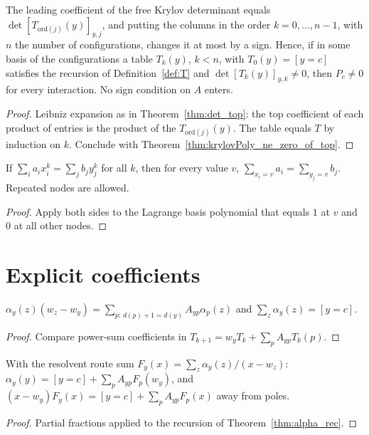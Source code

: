 \begin{theorem}
  \label{thm:krylovPoly_ne_zero_of_table}
  \leanok
  The leading coefficient of the free Krylov determinant equals $\det[T_{\mathrm{ord}(j)}(y)]_{y,j}$, and putting
  the columns in the order $k=0,\dots,n-1$, with $n$ the number of configurations, changes it at most by a sign. Hence,
  if in some basis of the configurations a table $T_k(y)$, $k<n$, with $T_0(y)=[y=c]$ satisfies the recursion of
  Definition~\ref{def:T} and $\det[T_k(y)]_{y,k}\neq0$, then $P_c\neq0$ for every interaction. No sign
  condition on $A$ enters.
\end{theorem}
\begin{proof}
  \leanok
  Leibniz expansion as in Theorem~\ref{thm:det_top}: the top coefficient of each product of entries is the
  product of the $T_{\mathrm{ord}(j)}(y)$. The table equals $T$ by induction on $k$. Conclude with
  Theorem~\ref{thm:krylovPoly_ne_zero_of_top}.
\end{proof}

\begin{theorem}
  \label{thm:ps_unique}
  \leanok
  If $\sum_ia_ix_i^k=\sum_jb_jy_j^k$ for all $k$, then for every value $v$,
  $\sum_{x_i=v}a_i=\sum_{y_j=v}b_j$. Repeated nodes are allowed.
\end{theorem}
\begin{proof}
  \leanok
  Apply both sides to the Lagrange basis polynomial that equals $1$ at $v$ and $0$ at all other nodes.
\end{proof}

\section{Explicit coefficients}

\begin{theorem}
  \label{thm:alpha_rec}
  \leanok
  $\alpha_y(z)(w_z-w_y)=\sum_{p:\,d(p)+1=d(y)}A_{yp}\alpha_p(z)$ and $\sum_z\alpha_y(z)=[y=c]$.
\end{theorem}
\begin{proof}
  \leanok
  Compare power-sum coefficients in $T_{k+1}=w_yT_k+\sum_pA_{yp}T_k(p)$.
\end{proof}

\begin{theorem}
  \label{thm:alpha_diag}
  \leanok
  With the resolvent route sum $F_y(x)=\sum_z\alpha_y(z)/(x-w_z)$:
  $\alpha_y(y)=[y=c]+\sum_pA_{yp}F_p(w_y)$, and $(x-w_y)F_y(x)=[y=c]+\sum_pA_{yp}F_p(x)$ away from poles.
\end{theorem}
\begin{proof}
  \leanok
  Partial fractions applied to the recursion of Theorem~\ref{thm:alpha_rec}.
\end{proof}

